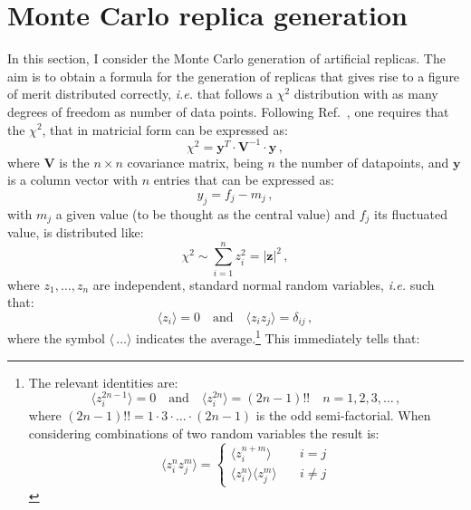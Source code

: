 \documentclass[10pt,a4paper]{article}
\begin{document}
\section{Monte Carlo replica generation}

In this section, I consider the Monte Carlo generation of artificial
replicas. The aim is to obtain a formula for the generation of
replicas that gives rise to a figure of merit distributed correctly,
\textit{i.e.} that follows a $\chi^2$ distribution with as many
degrees of freedom as number of data points. Following
Ref.~\cite{wiki:xxx}, one requires that the $\chi^2$, that in
matricial form can be expressed as:
\begin{equation}\label{eq:chi2matrix}
  \chi^2 = \mathbf{y}^{T}\cdot \mathbf{V}^{-1} \cdot \mathbf{y}\,,
\end{equation}
where $\mathbf{V}$ is the $n\times n$ covariance matrix, being $n$ the
number of datapoints, and $\mathbf{y}$ is a column vector with $n$
entries that can be expressed as:
\begin{equation}
y_j = f_j-m_j\,,
\end{equation}
with $m_j$ a given value (to be thought as the central value) and
$f_j$ its fluctuated value, is distributed like:
\begin{equation}\label{eq:wikipedia}
\chi^2\sim \sum_{i=1}^{n}z_i^2=|\mathbf{z}|^2\,,
\end{equation}
where $z_1,\dots , z_n$ are independent, standard normal random
variables, \textit{i.e.} such that:
\begin{equation}\label{eq:averages}
\langle z_i\rangle=0\quad\mbox{and}\quad \langle z_iz_j\rangle = \delta_{ij}\,,
\end{equation}
where the symbol $\langle\,\dots\rangle$ indicates the
average.\footnote{The relevant identities are:
\begin{equation}
  \langle z_i^{2n-1}\rangle = 0\quad\mbox{and}\quad \langle
  z_i^{2n}\rangle= (2n-1)!!\quad n=1,2,3,\dots\,,
\end{equation}
where $(2n-1)!!=1\cdot3\cdot\dots\cdot(2n-1)$ is the odd
semi-factorial. When considering combinations of two random variables
the result is:
\begin{equation}
  \langle z_i^n z_j^m\rangle = \left\{
\begin{array}{ll}
\langle z_i^{n+m}\rangle&\quad i = j\\
\langle z_i^n\rangle\langle z_j^m\rangle&\quad i \neq j
\end{array}
\right.
\end{equation}} This immediately tells that:
\end{document}
